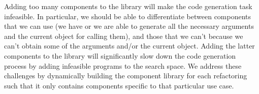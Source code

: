 \documentclass[conference]{IEEEtran}
\begin{document}
Adding too many components to the library will
make the code generation task infeasible. In particular, we should
be able to differentiate between components that we can use
(we have or we are able to generate
all the necessary arguments and the current object for calling them), and those
that we can't because we can't obtain some of the arguments
and/or the current object. Adding the latter components to the library will
significantly slow down the code generation process by
adding infeasible programs to the search space.
We address these challenges by dynamically building the component library for each refactoring
such that it only contains components specific to that particular use case.






\end{document}
